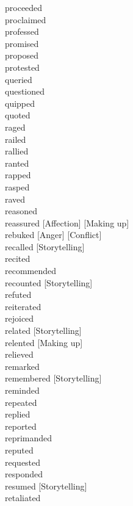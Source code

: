 proceeded \hfill \\
proclaimed \hfill \\
professed \hfill \\
promised \hfill \\
proposed \hfill \\
protested \hfill \\
queried \hfill \\
questioned \hfill \\
quipped \hfill \\
quoted \hfill \\
raged \hfill \\
railed \hfill \\
rallied \hfill \\
ranted \hfill \\
rapped \hfill \\
rasped \hfill \\
raved \hfill \\
reasoned \hfill \\
reassured [Affection] [Making up] \hfill \\
rebuked [Anger] [Conflict] \hfill \\
recalled [Storytelling] \hfill \\
recited \hfill \\
recommended \hfill \\
recounted [Storytelling] \hfill \\
refuted \hfill \\
reiterated \hfill \\
rejoiced \hfill \\
related [Storytelling] \hfill \\
relented [Making up] \hfill \\
relieved \hfill \\
remarked \hfill \\
remembered [Storytelling] \hfill \\
reminded \hfill \\
repeated \hfill \\
replied \hfill \\
reported \hfill \\
reprimanded \hfill \\
reputed \hfill \\
requested \hfill \\
responded \hfill \\
resumed [Storytelling] \hfill \\
retaliated \hfill \\
